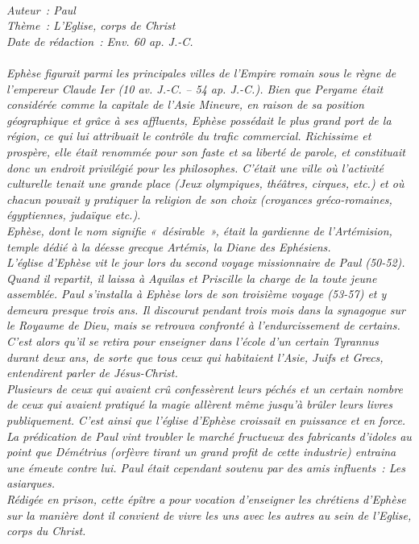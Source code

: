\BFont
\noindent\hrulefill
{\footnotesize
\textit{
\bigskip
{\centering{}
\\Auteur~: Paul
\\Thème~: L'Eglise, corps de Christ
\\Date de rédaction~: Env. 60 ap. J.-C.\\}
}
\textit{
\\Ephèse figurait parmi les principales villes de l'Empire romain sous le règne de l'empereur Claude Ier (10 av. J.-C. – 54 ap. J.-C.). Bien que Pergame était considérée comme la capitale de l'Asie Mineure, en raison de sa position géographique et grâce à ses affluents, Ephèse possédait le plus grand port de la région, ce qui lui attribuait le contrôle du trafic commercial. Richissime et prospère, elle était renommée pour son faste et sa liberté de parole, et constituait donc un endroit privilégié pour les philosophes. C'était une ville où l'activité culturelle tenait une grande place (Jeux olympiques, théâtres, cirques, etc.) et où chacun pouvait y pratiquer la religion de son choix (croyances gréco-romaines, égyptiennes, judaïque etc.).
\\Ephèse, dont le nom signifie «~désirable~», était la gardienne de l'Artémision, temple dédié à la déesse grecque Artémis, la Diane des Ephésiens.
\\L'église d'Ephèse vit le jour lors du second voyage missionnaire de Paul (50-52). Quand il repartit, il laissa à Aquilas et Priscille la charge de la toute jeune assemblée. Paul s'installa à Ephèse lors de son troisième voyage (53-57) et y demeura presque trois ans. Il discourut pendant trois mois dans la synagogue sur le Royaume de Dieu, mais se retrouva confronté à l'endurcissement de certains. C'est alors qu'il se retira pour enseigner dans l'école d'un certain Tyrannus durant deux ans, de sorte que tous ceux qui habitaient l'Asie, Juifs et Grecs, entendirent parler de Jésus-Christ.
\\Plusieurs de ceux qui avaient crû confessèrent leurs péchés et un certain nombre de ceux qui avaient pratiqué la magie allèrent même jusqu'à brûler leurs livres publiquement. C'est ainsi que l'église d'Ephèse croissait en puissance et en force. La prédication de Paul vint troubler le marché fructueux des fabricants d'idoles au point que Démétrius (orfèvre tirant un grand profit de cette industrie) entraina une émeute contre lui. Paul était cependant soutenu par des amis influents~: Les asiarques.
\\Rédigée en prison, cette épître a pour vocation d'enseigner les chrétiens d'Ephèse sur la manière dont il convient de vivre les uns avec les autres au sein de l'Eglise, corps du Christ.\bigskip
}
}
